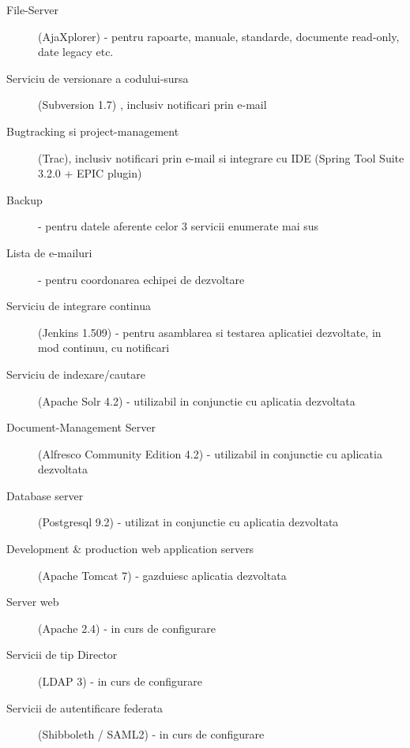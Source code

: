\begin{description}

\item[File-Server] (AjaXplorer) - pentru rapoarte, manuale, standarde, documente read-only, date legacy etc.

\item[Serviciu de versionare a codului-sursa] (Subversion 1.7) , inclusiv
    notificari prin e-mail

\item[Bugtracking si project-management] (Trac), inclusiv notificari prin
    e-mail si integrare cu IDE (Spring Tool Suite 3.2.0 + EPIC plugin)

\item[Backup] - pentru datele aferente celor 3 servicii enumerate mai sus

\item[Lista de e-mailuri] - pentru coordonarea echipei de dezvoltare

\item[Serviciu de integrare continua] (Jenkins 1.509) - pentru asamblarea si
    testarea aplicatiei dezvoltate, in mod continuu, cu notificari

\item[Serviciu de indexare/cautare] (Apache Solr 4.2) - utilizabil in
    conjunctie cu aplicatia dezvoltata

\item[Document-Management Server] (Alfresco Community Edition 4.2) -
    utilizabil in conjunctie cu aplicatia dezvoltata

\item[Database server] (Postgresql 9.2) - utilizat in conjunctie cu
    aplicatia dezvoltata

\item[Development \& production web application servers] (Apache Tomcat 7) -
    gazduiesc aplicatia dezvoltata

\item[Server web] (Apache 2.4) - in curs de configurare

\item[Servicii de tip Director] (LDAP 3) - in curs de configurare

\item[Servicii de autentificare federata] (Shibboleth / SAML2) - in curs de
configurare

\end{description}
    